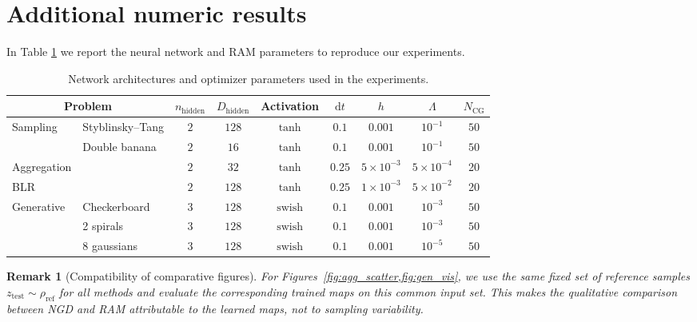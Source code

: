 \documentclass{article} %
\numberwithin{equation}{subsection}
\numberwithin{theorem}{section}
\newcommand{\dd}{\mathrm{d}}
\newcommand{\rhoref}{{\rho_{\text{ref}}}}
\newtheorem{remark}{Remark}[section]
\begin{document}
    \section{Additional numeric results}\label{ap:numerics}
    In Table \ref{tab:architectures} we report the neural network and RAM parameters to reproduce our experiments.
    \begin{table}[hb]
    \centering
    \caption{Network architectures and optimizer parameters used in the experiments.}
    \label{tab:architectures}
    \begin{tabular}{llccccc|cc}
        \toprule
        \multicolumn{2}{c}{Problem} & $n_{\text{hidden}}$ & $D_{\text{hidden}}$ & Activation & $\dd{t}$ & $h$ & $\Lambda$ & $N_{\text{CG}}$\\
        \midrule

        \multirow{2}{*}{Sampling}
            & Styblinsky--Tang & $2$ & $128$ & $\operatorname{tanh}$ & $0.1$ & $0.001$ & $10^{-1}$ & $50$ \\
            & Double banana    & $2$ & $16$ & $\operatorname{tanh}$ & $0.1$ & $0.001$ & $10^{-1}$ & $50$\\

        \midrule

        Aggregation
            &  & $2$ & $32$ & $\operatorname{tanh}$ & $0.25$ & $5\times10^{-3}$ & $5\times10^{-4}$ & 20 \\

        \midrule

        BLR  &  & $2$ & $128$ & $\operatorname{tanh}$ & $0.25$& $1\times10^{-3}$ & $5\times10^{-2}$ & 20\\
           

        \midrule

        \multirow{3}{*}{Generative}
            & Checkerboard & $3$ & $128$ & $\operatorname{swish}$ & $0.1$ & $0.001$ & $10^{-3}$ & $50$ \\
            & 2 spirals    & $3$ & $128$ & $\operatorname{swish}$ & $0.1$ & $0.001$ & $10^{-3}$ & $50$\\
            & 8 gaussians  & $3$ & $128$ & $\operatorname{swish}$ & $0.1$& $0.001$& $10^{-5}$ & $50$\\

        \bottomrule
    \end{tabular}
    \end{table}
    \begin{remark}[Compatibility of comparative figures]
For Figures~\cref{fig:agg_scatter,fig:gen_vis}, we use the same fixed set of
reference samples \(z_{\mathrm{test}}\sim\rhoref\) for all methods and evaluate
the corresponding trained maps on this common input set. This makes the qualitative
comparison between NGD and RAM attributable to the learned maps, not to sampling
variability.
\end{remark}
\end{document}
